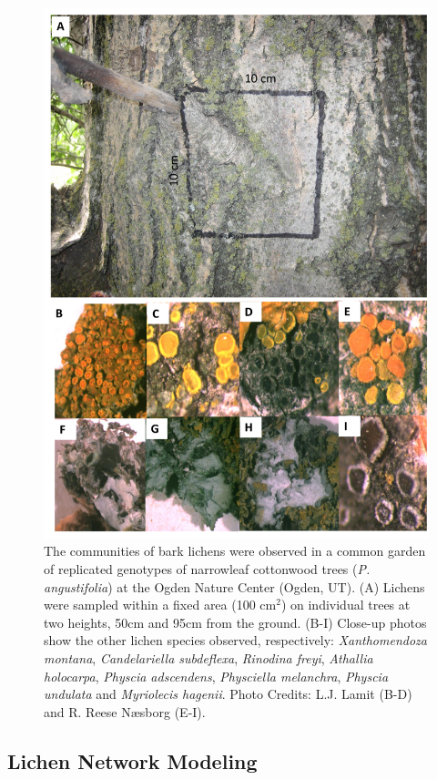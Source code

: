 \documentclass[fleqn,12pt]{olplainarticle}
\begin{document}
\begin{figure}[ht]
\includegraphics[width=0.90\linewidth]{figures/lcn_sampling.png}
\caption{The communities of bark lichens were observed in a common
  garden of replicated genotypes of narrowleaf cottonwood trees
  (\textit{P. angustifolia}) at the Ogden Nature Center (Ogden,
  UT). (A) Lichens were sampled within a fixed area (100 cm$^2$) on
  individual trees at two heights, 50cm and 95cm from the
  ground. (B-I) Close-up photos show the other lichen species
  observed, respectively:  \textit{Xanthomendoza montana},
  \textit{Candelariella subdeflexa}, \textit{Rinodina freyi},
  \textit{Athallia holocarpa}, \textit{Physcia adscendens},
  \textit{Physciella melanchra}, \textit{Physcia undulata} and
  \textit{Myriolecis hagenii}. Photo Credits: L.J. Lamit (B-D) and
  R. Reese Næsborg (E-I).}
\label{fig:lichen_sampling}
\end{figure}


\subsection*{Lichen Network Modeling}
\end{document}
